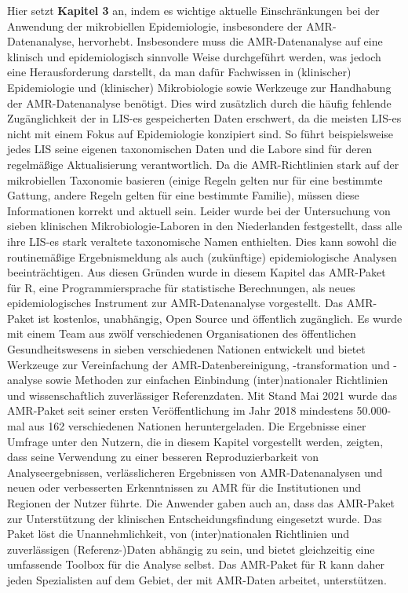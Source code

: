 \documentclass[
]{book}
\begin{document}
Hier setzt \textbf{Kapitel 3} an, indem es wichtige aktuelle Einschränkungen bei der Anwendung der mikrobiellen Epidemiologie, insbesondere der AMR-Datenanalyse, hervorhebt. Insbesondere muss die AMR-Datenanalyse auf eine klinisch und epidemiologisch sinnvolle Weise durchgeführt werden, was jedoch eine Herausforderung darstellt, da man dafür Fachwissen in (klinischer) Epidemiologie und (klinischer) Mikrobiologie sowie Werkzeuge zur Handhabung der AMR-Datenanalyse benötigt. Dies wird zusätzlich durch die häufig fehlende Zugänglichkeit der in LIS-es gespeicherten Daten erschwert, da die meisten LIS-es nicht mit einem Fokus auf Epidemiologie konzipiert sind. So führt beispielsweise jedes LIS seine eigenen taxonomischen Daten und die Labore sind für deren regelmäßige Aktualisierung verantwortlich. Da die AMR-Richtlinien stark auf der mikrobiellen Taxonomie basieren (einige Regeln gelten nur für eine bestimmte Gattung, andere Regeln gelten für eine bestimmte Familie), müssen diese Informationen korrekt und aktuell sein. Leider wurde bei der Untersuchung von sieben klinischen Mikrobiologie-Laboren in den Niederlanden festgestellt, dass alle ihre LIS-es stark veraltete taxonomische Namen enthielten. Dies kann sowohl die routinemäßige Ergebnismeldung als auch (zukünftige) epidemiologische Analysen beeinträchtigen. Aus diesen Gründen wurde in diesem Kapitel das AMR-Paket für R, eine Programmiersprache für statistische Berechnungen, als neues epidemiologisches Instrument zur AMR-Datenanalyse vorgestellt. Das AMR-Paket ist kostenlos, unabhängig, Open Source und öffentlich zugänglich. Es wurde mit einem Team aus zwölf verschiedenen Organisationen des öffentlichen Gesundheitswesens in sieben verschiedenen Nationen entwickelt und bietet Werkzeuge zur Vereinfachung der AMR-Datenbereinigung, -transformation und -analyse sowie Methoden zur einfachen Einbindung (inter)nationaler Richtlinien und wissenschaftlich zuverlässiger Referenzdaten. Mit Stand Mai 2021 wurde das AMR-Paket seit seiner ersten Veröffentlichung im Jahr 2018 mindestens 50.000-mal aus 162 verschiedenen Nationen heruntergeladen. Die Ergebnisse einer Umfrage unter den Nutzern, die in diesem Kapitel vorgestellt werden, zeigten, dass seine Verwendung zu einer besseren Reproduzierbarkeit von Analyseergebnissen, verlässlicheren Ergebnissen von AMR-Datenanalysen und neuen oder verbesserten Erkenntnissen zu AMR für die Institutionen und Regionen der Nutzer führte. Die Anwender gaben auch an, dass das AMR-Paket zur Unterstützung der klinischen Entscheidungsfindung eingesetzt wurde. Das Paket löst die Unannehmlichkeit, von (inter)nationalen Richtlinien und zuverlässigen (Referenz-)Daten abhängig zu sein, und bietet gleichzeitig eine umfassende Toolbox für die Analyse selbst. Das AMR-Paket für R kann daher jeden Spezialisten auf dem Gebiet, der mit AMR-Daten arbeitet, unterstützen.
\end{document}
